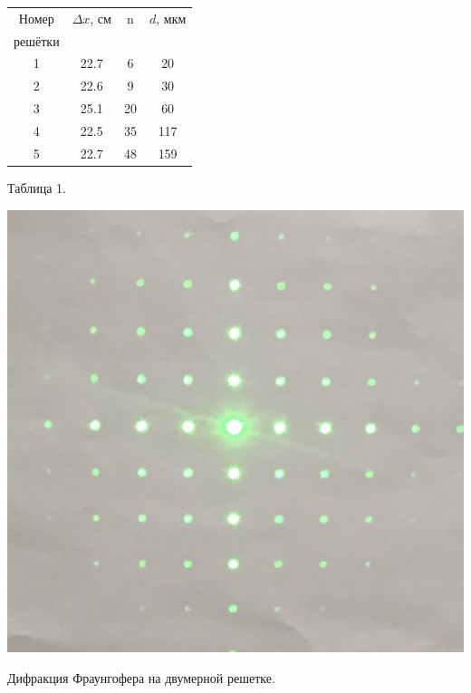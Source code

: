 \begin{minipage}{0.47\textwidth}
\begin{center}
\begin{tabular}{|c|c|c|c|}
\hline
Номер &$\Delta x$, см &  n&$d$, мкм\\
решётки&		&			& \\
\hline
1 &	22.7	&6	& 		20	\\
\hline
2&	22.6	&	9	&	30		\\
\hline
3&	25.1	&20		&	60		\\
\hline
4&	22.5	&	35	&	117		\\
\hline
5&	22.7	&	48	&		159	\\
\hline
\end{tabular}
\newline
\newline
Таблица 1. 
\end{center}
\end{minipage}
\begin{minipage}{0.47\textwidth}
\begin{center}
\includegraphics[width = \textwidth]{2.JPG}
\end{center}

\begin{center}
Дифракция Фраунгофера на двумерной решетке.
\end{center}
\end{minipage}



